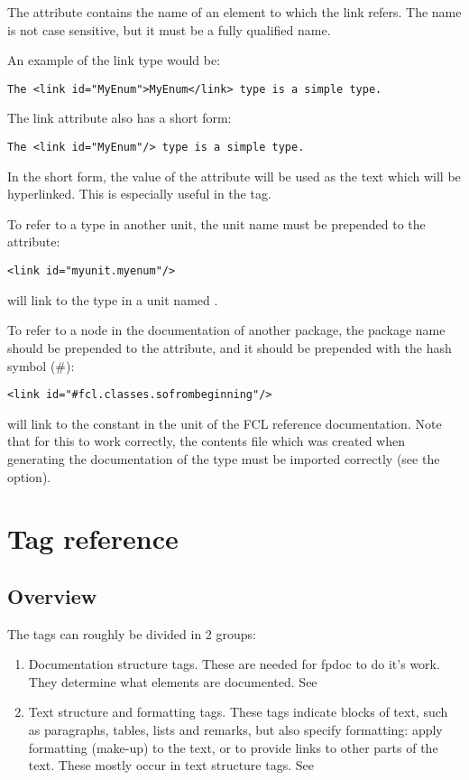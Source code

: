 The  attribute contains the name of an element to which the link
refers. The name is not case sensitive, but it must be a fully qualified
name.

An example of the link type would be:
\begin{verbatim}
The <link id="MyEnum">MyEnum</link> type is a simple type.
\end{verbatim}

The link attribute also has a short form: 
\begin{verbatim}
The <link id="MyEnum"/> type is a simple type.
\end{verbatim}
In the short form, the value of the  attribute will be used as the 
text which will be hyperlinked. This is especially useful in the 
tag.

To refer to a type in another unit, the unit name must be prepended to the
 attribute:
\begin{verbatim}
<link id="myunit.myenum"/>
\end{verbatim}
will link to the  type in a unit named .

To refer to a node in the documentation of another package, the package name
should be prepended to the  attribute, and it should be prepended
with the hash symbol (\#):
\begin{verbatim}
<link id="#fcl.classes.sofrombeginning"/>
\end{verbatim}
will link to the constant  in the  unit
of the FCL reference documentation. Note that for this to work correctly,
the contents file which was created when generating the documentation of 
the type must be imported correctly (see the  option).

\section{Tag reference}
\subsection{Overview}
The tags can roughly be divided in 2 groups:
\begin{enumerate}
\item Documentation structure tags. These are needed for fpdoc to do it's
work. They determine what elements are documented. See 
\item Text structure and formatting tags. These tags indicate blocks of text, such as
paragraphs, tables, lists and remarks, but also specify formatting: apply formatting (make-up) 
to the text, or to provide links to other parts of the text. These mostly occur in
text structure tags. See 
\end{enumerate}

